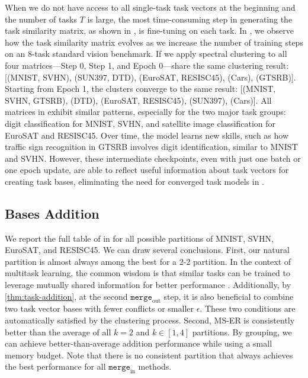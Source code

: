 When we do not have access to all single-task task vectors at the beginning and the number of tasks $T$ is large, the most time-consuming step in generating the task similarity matrix, as shown in , is fine-tuning on each task. In , we observe how the task similarity matrix evolves as we increase the number of training steps on an 8-task standard vision benchmark. If we apply spectral clustering to all four matrices—Step 0, Step 1, and Epoch 0—share the same clustering result: [(MNIST, SVHN), (SUN397, DTD), (EuroSAT, RESISC45), (Cars), (GTSRB)]. Starting from Epoch 1, the clusters converge to the same result: [(MNIST, SVHN, GTSRB), (DTD), (EuroSAT, RESISC45), (SUN397), (Cars)]. All matrices in  exhibit similar patterns, especially for the two major task groups: digit classification for MNIST, SVHN, and satellite image classification for EuroSAT and RESISC45. Over time, the model learns new skills, such as how traffic sign recognition in GTSRB involves digit identification, similar to MNIST and SVHN. However, these intermediate checkpoints, even with just one batch or one epoch update, are able to reflect useful information about task vectors for creating task bases, eliminating the need for converged task models in .


\subsection{Bases Addition}
\label{sec:cv_exp_details}

We report the full table of  in  for all possible partitions of MNIST, SVHN, EuroSAT, and RESISC45. We can draw several conclusions. First, our natural partition is almost always among the best for a 2-2 partition. In the context of multitask learning, the common wisdom is that similar tasks can be trained to leverage mutually shared information for better performance \citep{caruana1993multitask}. Additionally, by \cref{thm:task-addition}, at the second $\texttt{merge}_\text{out}$ step, it is also beneficial to combine two task vector bases with fewer conflicts or smaller $\epsilon$. These two conditions are automatically satisfied by the clustering process. Second, MS-ER is consistently better than the average of all $k = 2$ and $k \in [1,4]$ partitions. By grouping, we can achieve better-than-average addition performance while using a small memory budget. Note that there is no consistent partition that always achieves the best performance for all $\texttt{merge}_\text{in}$ methods.


